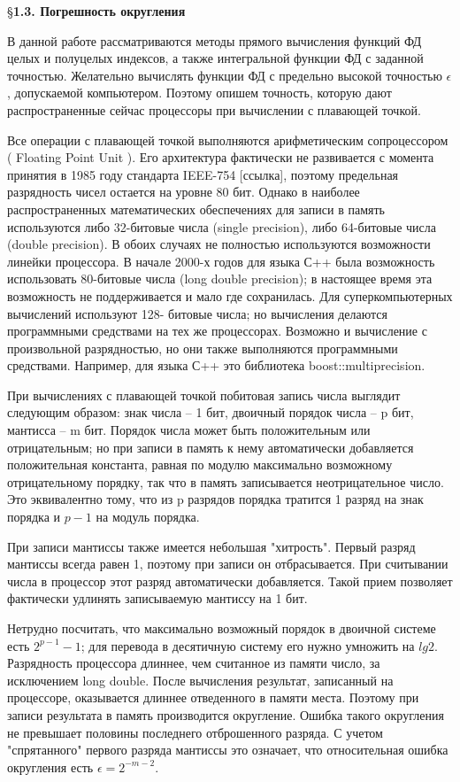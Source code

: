 \S \textbf{1.3. Погрешность округления}

В данной работе рассматриваются методы прямого вычисления функций
ФД целых и полуцелых индексов, а также интегральной функции ФД с
заданной точностью. Желательно вычислять функции ФД с предельно высокой
точностью $\epsilon$, допускаемой компьютером. Поэтому опишем точность, которую
дают распространенные сейчас процессоры при вычислении с плавающей
точкой.

Все операции с плавающей точкой
выполняются арифметическим сопроцессором ( Floating Point Unit ). Его
архитектура фактически не развивается с момента принятия в 1985 году
стандарта IEEE-754 [ссылка], поэтому предельная разрядность чисел остается на
уровне 80 бит. Однако в наиболее распространенных математических
обеспечениях для записи в память используются либо 32-битовые числа (single
precision), либо 64-битовые числа (double precision). В обоих случаях не
полностью используются возможности линейки процессора. В начале 2000-х
годов для языка С++ была возможность использовать 80-битовые числа (long
double precision); в настоящее время эта возможность не поддерживается и мало
где сохранилась. Для суперкомпьютерных вычислений используют 128-
битовые числа; но вычисления делаются программными средствами на тех же
процессорах. Возможно и вычисление с произвольной разрядностью, но они
также выполняются программными средствами. Например, для языка С++ это
библиотека boost::multiprecision.

При вычислениях с плавающей точкой побитовая запись числа выглядит
следующим образом: знак числа – 1 бит, двоичный порядок числа – p бит,
мантисса – m бит. Порядок числа может быть положительным или
отрицательным; но при записи в память к нему автоматически добавляется
положительная константа, равная по модулю максимально возможному
отрицательному порядку, так что в память записывается неотрицательное
число. Это эквивалентно тому, что из p разрядов порядка тратится 1 разряд на
знак порядка и $p - 1$ на модуль порядка.

При записи мантиссы также имеется небольшая "хитрость". Первый
разряд мантиссы всегда равен 1, поэтому при записи он отбрасывается. При
считывании числа в процессор этот разряд автоматически добавляется. Такой
прием позволяет фактически удлинять записываемую мантиссу на 1 бит.

Нетрудно посчитать, что максимально возможный порядок в двоичной
системе есть $2^{p-1} - 1$; для перевода в десятичную систему его нужно умножить
на $lg2$. Разрядность процессора длиннее, чем считанное из памяти число, за
исключением long double. После вычисления результат, записанный на
процессоре, оказывается длиннее отведенного в памяти места. Поэтому при
записи результата в память производится округление. Ошибка такого
округления не превышает половины последнего отброшенного разряда. С
учетом "спрятанного" первого разряда мантиссы это означает, что
относительная ошибка округления есть $\epsilon = 2^{-m-2}$.

